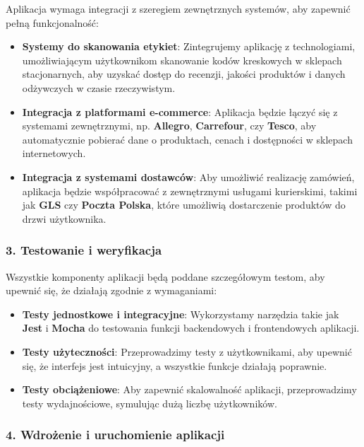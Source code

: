 \documentclass[12pt,a4paper]{article}
\begin{document}
Aplikacja wymaga integracji z szeregiem zewnętrznych systemów, aby zapewnić pełną funkcjonalność:
\begin{itemize}
    \item \textbf{Systemy do skanowania etykiet}: Zintegrujemy aplikację z technologiami,
        umożliwiającym użytkownikom skanowanie kodów kreskowych w sklepach stacjonarnych,
        aby uzyskać dostęp do recenzji, jakości produktów i danych odżywczych w czasie rzeczywistym.
    \item \textbf{Integracja z platformami e-commerce}: Aplikacja będzie łączyć się z systemami
        zewnętrznymi, np. \textbf{Allegro}, \textbf{Carrefour}, czy \textbf{Tesco}, aby
        automatycznie pobierać dane o produktach, cenach i dostępności w sklepach internetowych.
    \item \textbf{Integracja z systemami dostawców}: Aby umożliwić realizację zamówień, aplikacja
        będzie współpracować z zewnętrznymi usługami kurierskimi, takimi jak \textbf{GLS} czy
        \textbf{Poczta Polska}, które umożliwią dostarczenie produktów do drzwi użytkownika.
\end{itemize}

\subsubsection*{3. Testowanie i weryfikacja}

Wszystkie komponenty aplikacji będą poddane szczegółowym testom, aby upewnić się, że działają
zgodnie z wymaganiami:
\begin{itemize}
    \item \textbf{Testy jednostkowe i integracyjne}: Wykorzystamy narzędzia takie jak \textbf{Jest}
        i \textbf{Mocha} do testowania funkcji backendowych i frontendowych aplikacji.
    \item \textbf{Testy użyteczności}: Przeprowadzimy testy z użytkownikami, aby upewnić się,
        że interfejs jest intuicyjny, a wszystkie funkcje działają poprawnie.
    \item \textbf{Testy obciążeniowe}: Aby zapewnić skalowalność aplikacji, przeprowadzimy
        testy wydajnościowe, symulując dużą liczbę użytkowników.
\end{itemize}

\subsubsection*{4. Wdrożenie i uruchomienie aplikacji}
\end{document}
